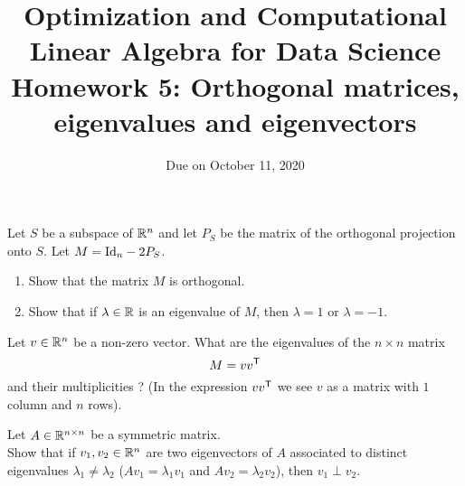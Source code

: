 \documentclass[11pt,nocut]{article}
\title{\vspace{-2.0cm}%
	Optimization and Computational Linear Algebra for Data Science\\
Homework 5: Orthogonal matrices, eigenvalues and eigenvectors}
\date{\vspace{-1cm}Due on October 11, 2020}
\begin{document}
\maketitle


\begin{problem}[2 points]
	Let $S$ be a subspace of $\mathbb{R}^n$ and let $P_S$ be the matrix of the orthogonal projection onto $S$. Let $M = {{\rm Id}}_n - 2 P_S$.
	\begin{enumerate}[label=\normalfont(\textbf{\alph*})]
		\item Show that the matrix $M$ is orthogonal.
		\item Show that if $\lambda \in \mathbb{R}$ is an eigenvalue of $M$, then $\lambda = 1$ or $\lambda=-1$.
	\end{enumerate}
\end{problem}

\vspace{1mm}


\begin{problem}[2 points]
	Let $v \in \mathbb{R}^n$ be a non-zero vector. What are the eigenvalues of the $n \times n$ matrix
	$$
		M = v v^{{\sf T}}
	$$
	and their multiplicities ? (In the expression $vv^{{\sf T}}$ we see $v$ as a matrix with $1$ column and $n$ rows).
\end{problem}

\vspace{1mm}
\begin{problem}[2 points]
	Let $A \in \mathbb{R}^{n \times n}$ be a symmetric matrix.
	\\
	Show that if $v_1, v_2 \in \mathbb{R}^n$ are two eigenvectors of $A$ associated to distinct eigenvalues $\lambda_1 \neq \lambda_2$ ($Av_1 = \lambda_1 v_1$ and $Av_2 = \lambda_2 v_2$), then $v_1 \perp v_2$.
\end{problem}



\vspace{1mm}


\end{document}
